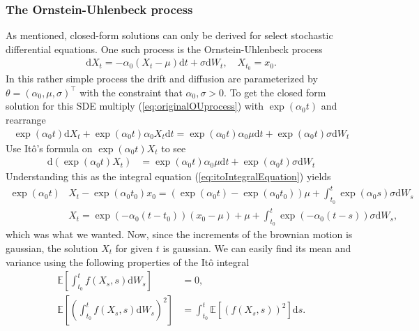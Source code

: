 \subsubsection{The Ornstein-Uhlenbeck process}
As mentioned, closed-form solutions can only be derived for select stochastic differential equations. One such process is the Ornstein-Uhlenbeck process
\begin{align}
    \mathrm{d}X_t = -\alpha_0\left(X_t - \mu\right)\mathrm{d}t + \sigma \mathrm{d}W_t, \quad X_{t_0} = x_0. \label{eq:originalOUprocess}
\end{align}
In this rather simple process the drift and diffusion are parameterized by $\theta = \left(\alpha_0, \mu, \sigma\right)^\top$ with the constraint that $\alpha_0, \sigma>0$.
To get the closed form solution for this SDE multiply (\ref{eq:originalOUprocess}) with $\exp\left(\alpha_0 t\right)$ and rearrange
\begin{align}
    \exp\left(\alpha_0 t\right)\mathrm{d}X_t + \exp\left(\alpha_0 t\right) \alpha_0 X_t \mathrm{d}t = \exp\left(\alpha_0 t\right)\alpha_0\mu \mathrm{d}t + \exp\left(\alpha_0 t\right)\sigma \mathrm{d}W_t
\end{align}
Use Itô's formula on $\exp\left(\alpha_0 t\right)X_t$ to see
\begin{align}
    \mathrm{d}\left(\exp\left(\alpha_0 t\right)X_t\right) &= \exp\left(\alpha_0 t\right)\alpha_0 \mu \mathrm{d}t + \exp\left(\alpha_0 t\right) \sigma \mathrm{d}W_t \nonumber
\end{align}
Understanding this as the integral equation (\ref{eq:itoIntegralEquation}) yields
\begin{align}
    \exp\left(\alpha_0 t\right)&X_t - \exp\left(\alpha_0 t_0\right)x_0 = \left(\exp\left(\alpha_0 t\right) - \exp\left(\alpha_0 t_0\right)\right)\mu + \int_{t_0}^t \exp\left(\alpha_0 s\right)\sigma \mathrm{d}W_s \nonumber \\
    &X_t = \exp\left(-\alpha_0\left(t - t_0\right)\right)\left(x_0 - \mu\right) + \mu + \int_{t_0}^t \exp\left(-\alpha_0 \left(t - s\right)\right)\sigma \mathrm{d}W_s \label{eq:OU_solution},
\end{align}
which was what we wanted. Now, since the increments of the brownian motion is gaussian, the solution $X_t$ for given $t$ is gaussian. We can easily find its mean and variance using the following properties of the Itô integral \cite[theorem 3.2.1 and lemma 3.1.5]{Oksendal2003_yu}
\begin{align}
    \mathbb{E}\left[\int_{t_0}^t f(X_s, s) \mathrm{d}W_s\right] &= 0 \label{eq:meanOfItoIntegral},\\
    \mathbb{E}\left[\left(\int_{t_0}^t f(X_s, s) \mathrm{d}W_s\right)^2\right] &= \int_{t_0}^t \mathbb{E}\left[\left(f(X_s, s)\right)^2\right] \mathrm{d}s. \label{eq:ItoIsometry}
\end{align}

